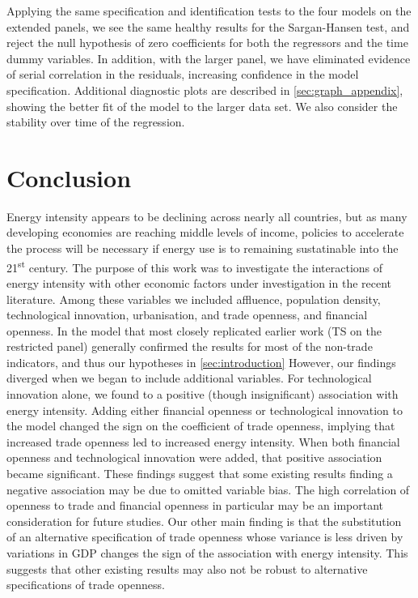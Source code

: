 \documentclass[12pt,a4paper]{article}
\begin{document}
Applying the same specification and identification tests to the four models on the extended panels, we see the same healthy results for the Sargan-Hansen test, and reject the null hypothesis of zero coefficients for both the regressors and the time dummy variables.
In addition, with the larger panel, we have eliminated evidence of serial correlation in the residuals, increasing confidence in the model specification.
Additional diagnostic plots are described in \cref{sec:graph_appendix}, showing the better fit of the model to the larger data set.
We also consider the stability over time of the regression. 

\FloatBarrier

\section{Conclusion}\label{sec:conclusion}

Energy intensity appears to be declining across nearly all countries, but as many developing economies are reaching middle levels of income, policies to accelerate the process will be necessary if energy use is to remaining sustatinable into the 21\textsuperscript{st} century.
The purpose of this work was to investigate the interactions of energy intensity with other economic factors under investigation in the recent literature.
Among these variables we included affluence, population density, technological innovation, urbanisation, and trade openness, and financial openness.
In the model that most closely replicated earlier work (TS on the restricted panel) generally confirmed the results for most of the non-trade indicators, and thus our hypotheses in \cref{sec:introduction}
However, our findings diverged when we began to include additional variables. 
For technological innovation alone, we found to a positive (though insignificant) association with energy intensity.
Adding either financial openness or technological innovation to the model changed the sign on the coefficient of trade openness, implying that increased trade openness led to increased energy intensity.
When both financial openness and technological innovation were added, that positive association became significant.
These findings suggest that some existing results finding a negative association may be due to omitted variable bias.
The high correlation of openness to trade and financial openness in particular may be an important consideration for future studies.
Our other main finding is that the substitution of an alternative specification of trade openness whose variance is less driven by variations in GDP changes the sign of the association with energy intensity.
This suggests that other existing results may also not be robust to alternative specifications of trade openness.
\end{document}
